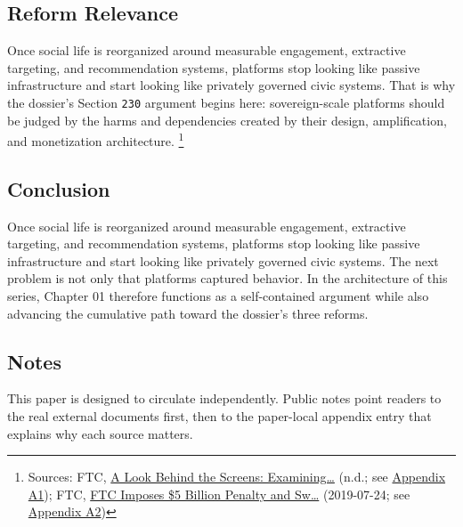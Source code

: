 \documentclass[
  american,
  11pt,
  letterpaper,
]{article}
\begin{document}
\subsection{Reform Relevance}\label{reform-relevance}

Once social life is reorganized around measurable engagement, extractive
targeting, and recommendation systems, platforms stop looking like
passive infrastructure and start looking like privately governed civic
systems. That is why the dossier's Section \texttt{230} argument begins
here: sovereign-scale platforms should be judged by the harms and
dependencies created by their design, amplification, and monetization
architecture. \footnote{Sources: FTC,
  \href{https://www.ftc.gov/reports/look-behind-screens-examining-data-practices-social-media-video-streaming-services}{A
  Look Behind the Screens: Examining\ldots{}} (n.d.; see
  \hyperref[appendix-a1-a-look-behind-the-screens-examining-the-data-practices-of-social-media-and-video-streaming-services]{Appendix
  A1}); FTC,
  \href{https://www.ftc.gov/news-events/news/press-releases/2019/07/ftc-imposes-5-billion-penalty-sweeping-new-privacy-restrictions-facebook}{FTC
  Imposes \$5 Billion Penalty and Sw\ldots{}} (2019-07-24; see
  \hyperref[appendix-a2-ftc-imposes-5-billion-penalty-and-sweeping-new-privacy-restrictions-on-facebook]{Appendix
  A2})}

\subsection{Conclusion}\label{conclusion}

Once social life is reorganized around measurable engagement, extractive
targeting, and recommendation systems, platforms stop looking like
passive infrastructure and start looking like privately governed civic
systems. The next problem is not only that platforms captured behavior.
In the architecture of this series, Chapter 01 therefore functions as a
self-contained argument while also advancing the cumulative path toward
the dossier's three reforms.

\subsection{Notes}\label{notes}

This paper is designed to circulate independently. Public notes point
readers to the real external documents first, then to the paper-local
appendix entry that explains why each source matters.
\end{document}
